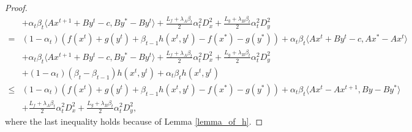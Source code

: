 \documentclass{article}
\numberwithin{equation}{section}
\begin{document}
\begin{proof}
\begin{align}
        &+ \alpha_t\beta_{t}\langle Ax^{t+1} +By^t -c, By^* -By^t\rangle +\frac{L_f+\lambda_{A} \beta_{t}}{2}\alpha_t^2D_x^2+ \frac{L_g +\lambda_{B} \beta_{t}}{2}\alpha_t^2D_y^2 \nonumber \\
        =& (1-\alpha_t)\left(f(x^t) +g(y^t)+\beta_{t-1}h(x^t,y^t) -f(x^*)-g(y^*)\right)+\alpha_t\beta_{t}\langle Ax^t+By^t-c,Ax^*-Ax^t\rangle \nonumber \\
        &+ \alpha_t\beta_{t}\langle Ax^{t+1} +By^t -c, By^* -By^t\rangle +\frac{L_f+\lambda_{A} \beta_{t}}{2}\alpha_t^2D_x^2+ \frac{L_g +\lambda_{B} \beta_{t}}{2}\alpha_t^2D_y^2
        \nonumber \\
        & +(1-\alpha_t)(\beta_{t}-\beta_{t-1})h(x^t,y^t) + \alpha_t\beta_{t} h(x^t,y^t)  \nonumber \\
        \leq & (1-\alpha_t)\left(f(x^t) +g(y^t)+\beta_{t-1}h(x^t,y^t) -f(x^*)-g(y^*)\right) 
        +\alpha_t\beta_t\langle Ax^t-Ax^{t+1}, By-By^*\rangle \nonumber \\
        &+  \frac{L_f+\lambda_{A} \beta_{t}}{2}\alpha_t^2D_x^2+ \frac{L_g +\lambda_{B} \beta_{t}}{2}\alpha_t^2D_y^2,  \label{F_k-F_k+1_Lipschitz}
    \end{align}
    where the last inequality holds because of Lemma \ref{lemma_of_h}. 


\end{proof}
\end{document}
